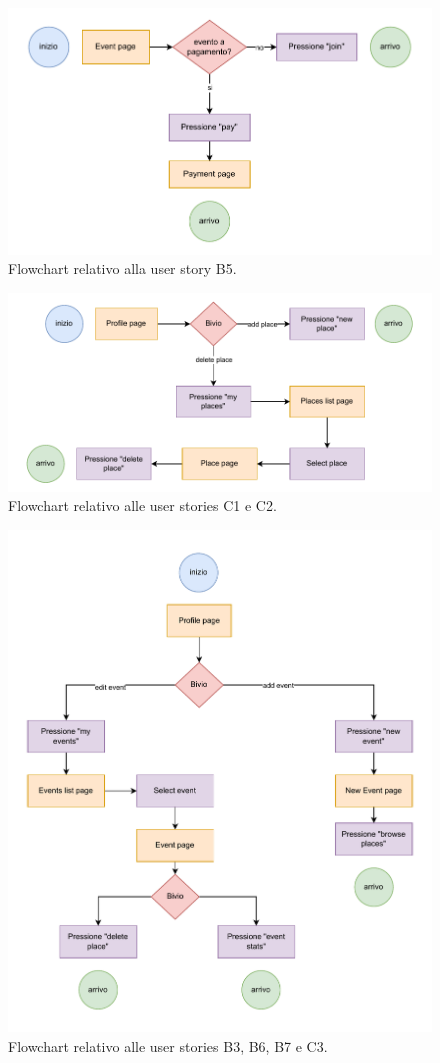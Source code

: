 \documentclass[9pt]{extarticle}
\begin{document}
\begin{figure}[!htb]
	\centering
	\includegraphics[width=0.8\linewidth]{./images/B5.pdf}
	\caption{Flowchart relativo alla user story B5.}
	\label{fig:B5}
\end{figure}

\newpage  

\begin{figure}[!htb]
	\centering
	\includegraphics[width=0.8\linewidth]{./images/C1-C2.pdf}
	\caption{Flowchart relativo alle user stories C1 e C2.}
	\label{fig:C1-C2}
\end{figure}

\begin{figure}[!htb]
	\centering
	\includegraphics[width=0.8\linewidth]{./images/B3-B6-B7-C3.pdf}
	\caption{Flowchart relativo alle user stories B3, B6, B7 e C3.}
	\label{fig:B3-B6-B7-C3}
\end{figure}
\end{document}
